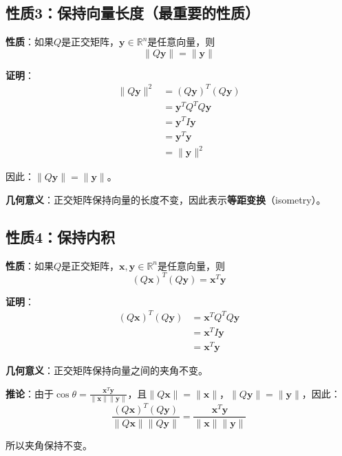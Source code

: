 \documentclass[12pt,a4paper]{article}
\begin{document}
\subsection{性质3：保持向量长度（最重要的性质）}

\textbf{性质}：如果$Q$是正交矩阵，$\bm{y} \in \mathbb{R}^n$是任意向量，则
\begin{equation}
\|Q\bm{y}\| = \|\bm{y}\|
\label{eq:preserve_norm}
\end{equation}

\textbf{证明}：
\begin{align}
\|Q\bm{y}\|^2 &= (Q\bm{y})^T (Q\bm{y}) \\
&= \bm{y}^T Q^T Q \bm{y} \\
&= \bm{y}^T I \bm{y} \\
&= \bm{y}^T \bm{y} \\
&= \|\bm{y}\|^2
\end{align}

因此：$\|Q\bm{y}\| = \|\bm{y}\|$。

\textbf{几何意义}：正交矩阵保持向量的长度不变，因此表示\textbf{等距变换}（isometry）。

\subsection{性质4：保持内积}

\textbf{性质}：如果$Q$是正交矩阵，$\bm{x}, \bm{y} \in \mathbb{R}^n$是任意向量，则
\begin{equation}
(Q\bm{x})^T (Q\bm{y}) = \bm{x}^T \bm{y}
\label{eq:preserve_inner_product}
\end{equation}

\textbf{证明}：
\begin{align}
(Q\bm{x})^T (Q\bm{y}) &= \bm{x}^T Q^T Q \bm{y} \\
&= \bm{x}^T I \bm{y} \\
&= \bm{x}^T \bm{y}
\end{align}

\textbf{几何意义}：正交矩阵保持向量之间的夹角不变。

\textbf{推论}：由于$\cos\theta = \frac{\bm{x}^T \bm{y}}{\|\bm{x}\| \|\bm{y}\|}$，且$\|Q\bm{x}\| = \|\bm{x}\|$，$\|Q\bm{y}\| = \|\bm{y}\|$，因此：
\begin{equation}
\frac{(Q\bm{x})^T (Q\bm{y})}{\|Q\bm{x}\| \|Q\bm{y}\|} = \frac{\bm{x}^T \bm{y}}{\|\bm{x}\| \|\bm{y}\|}
\end{equation}

所以夹角保持不变。
\end{document}
